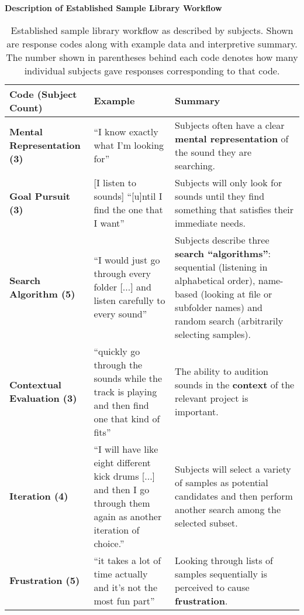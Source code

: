 \begin{table}[!htb]
  \renewcommand{\arraystretch}{1.2}
  \centering
  \textbf{Description of Established Sample Library Workflow} \\ [3mm]
  \footnotesize
  \colorbox{light-bg}{
  \begin{tabular}{ p{4.0cm} p{4.75cm} p{4.75cm} }
  \hline
    \textbf{Code (Subject Count)} & \textbf{Example} & \textbf{Summary} \\
    \hline
    \textbf{Mental Representation (3)}
    &
    ``I know exactly what I'm looking for''
    &
    Subjects often have a clear \textbf{mental representation} of the sound they
    are searching.
    \\
    \textbf{Goal Pursuit (3)}
    &
    [I listen to sounds] ``[u]ntil I find the one that I want''
    &
    Subjects will only look for sounds until they find something that satisfies
    their immediate needs.
    \\
    \textbf{Search Algorithm (5)}
    &
    ``I would just go through every folder [...] and listen carefully to every
    sound''
    &
    Subjects describe three \textbf{search ``algorithms''}: sequential
    (listening in alphabetical order), name-based (looking at file or subfolder
    names) and random search (arbitrarily selecting samples).
    \\
    \textbf{Contextual Evaluation (3)}
    &
    ``quickly go through the sounds while the track is playing and then find
    one that kind of fits''
    &
    The ability to audition sounds in the \textbf{context} of the relevant
    project is important.
    \\
    \textbf{Iteration (4)}
    &
    ``I will have like eight different kick drums [...] and then I go through
    them again as another iteration of choice.''
    &
    Subjects will select a variety of samples as potential candidates and then
    perform another search among the selected subset.
    \\
    \textbf{Frustration (5)}
    &
    ``it takes a lot of time actually and it's not the most fun part''
    &
    Looking through lists of samples sequentially is perceived to cause
    \textbf{frustration}.
    \\
  \end{tabular}}
  \caption[Established Sample Library Workflow Description: Response Codes]
  {Established sample library workflow as described by subjects. Shown are
  response codes along with example data and interpretive summary. The number
  shown in parentheses behind each code denotes how many individual subjects
  gave responses corresponding to that code.}
  \label{table:current_workflow_description}
\end{table}

